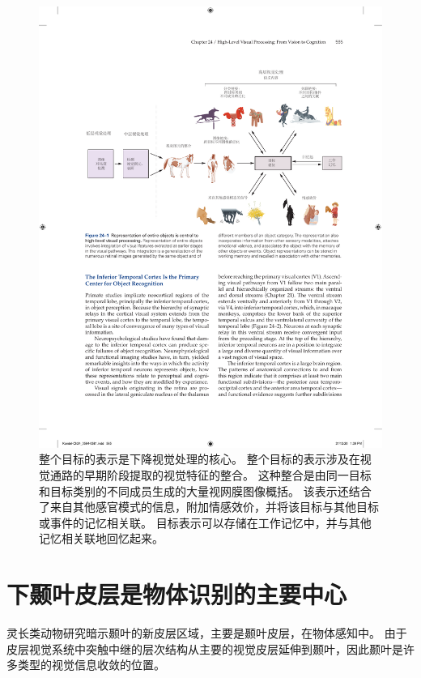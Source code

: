 \begin{figure}[htbp]
	\centering
	\includegraphics[width=1.0\linewidth]{chap24/fig_24_1}
	\caption{整个目标的表示是下降视觉处理的核心。
		整个目标的表示涉及在视觉通路的早期阶段提取的视觉特征的整合。
		这种整合是由同一目标和目标类别的不同成员生成的大量视网膜图像概括。
		该表示还结合了来自其他感官模式的信息，附加情感效价，并将该目标与其他目标或事件的记忆相关联。
		目标表示可以存储在工作记忆中，并与其他记忆相关联地回忆起来。}
	\label{fig:24_1}
\end{figure}



\section{下颞叶皮层是物体识别的主要中心}

灵长类动物研究暗示颞叶的新皮层区域，主要是颞叶皮层，在物体感知中。
由于皮层视觉系统中突触中继的层次结构从主要的视觉皮层延伸到颞叶，因此颞叶是许多类型的视觉信息收敛的位置。



